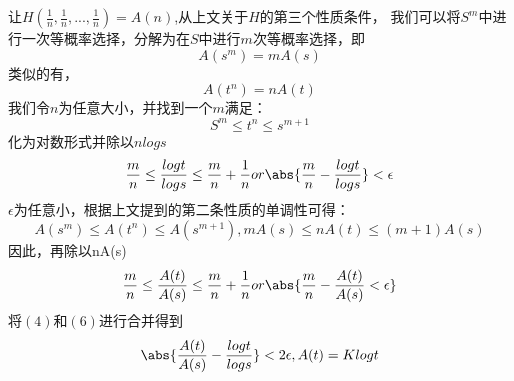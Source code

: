 让$H(\frac{1}{n},\frac{1}{n},...,\frac{1}{n})=A(n)$,从上文关于$H$的第三个性质条件，
我们可以将$S^m$中进行一次等概率选择，分解为在$S$中进行$m$次等概率选择，即
\begin{equation}
A(s^m)=mA(s)
\end{equation}
类似的有，
\begin{equation}
A(t^n)=nA(t)
\end{equation}
我们令$n$为任意大小，并找到一个$m$满足：
\begin{equation}
S^m\leq t^n\leq s^{m+1}
\end{equation}
化为对数形式并除以$nlogs$
\begin{equation}
\frac{m}{n}\leq \frac{logt}{logs}\leq \frac{m}{n}+\frac{1}{n} or \abs{\frac{m}{n}-\frac{logt}{logs}}< \epsilon
\end{equation}
$\epsilon$为任意小，根据上文提到的第二条性质的单调性可得：
\begin{equation}
A(s^m)\leq A(t^n) \leq A(s^{m+1}), mA(s)\leq nA(t) \leq (m+1)A(s)
\end{equation}
因此，再除以nA(s)
\begin{equation}
\frac{m}{n}\leq \frac{A(t)}{A(s)}\leq \frac{m}{n}+\frac{1}{n} or \abs{\frac{m}{n} -\frac{A(t)}{A(s)} <\epsilon}
\end{equation}
将$(4)$和$(6)$进行合并得到
\begin{equation}
\abs{\frac{A(t)}{A(s)} - \frac{logt}{logs}} <2\epsilon ,A(t)=Klogt
\end{equation}
